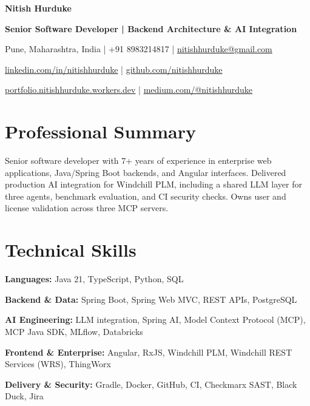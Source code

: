 \documentclass[a4paper,10pt]{article}
\begin{document}
{\LARGE\bfseries Nitish Hurduke}\par
\vspace{3pt}
{\bfseries Senior Software Developer | Backend Architecture \& AI Integration}\par
Pune, Maharashtra, India | +91 8983214817 | \href{mailto:nitishhurduke@gmail.com}{nitishhurduke@gmail.com}\par
\href{https://www.linkedin.com/in/nitishhurduke/}{linkedin.com/in/nitishhurduke} | \href{https://github.com/nitishhurduke}{github.com/nitishhurduke}\par
\href{https://portfolio.nitishhurduke.workers.dev/}{portfolio.nitishhurduke.workers.dev} | \href{https://medium.com/@nitishhurduke}{medium.com/@nitishhurduke}

\section{Professional Summary}
Senior software developer with 7+ years of experience in enterprise web applications, Java/Spring Boot backends, and Angular interfaces. Delivered production AI integration for Windchill PLM, including a shared LLM layer for three agents, benchmark evaluation, and CI security checks. Owns user and license validation across three MCP servers.

\section{Technical Skills}
\textbf{Languages:} Java 21, TypeScript, Python, SQL\par
\textbf{Backend \& Data:} Spring Boot, Spring Web MVC, REST APIs, PostgreSQL\par
\textbf{AI Engineering:} LLM integration, Spring AI, Model Context Protocol (MCP), MCP Java SDK, MLflow, Databricks\par
\textbf{Frontend \& Enterprise:} Angular, RxJS, Windchill PLM, Windchill REST Services (WRS), ThingWorx\par
\textbf{Delivery \& Security:} Gradle, Docker, GitHub, CI, Checkmarx SAST, Black Duck, Jira
\end{document}
